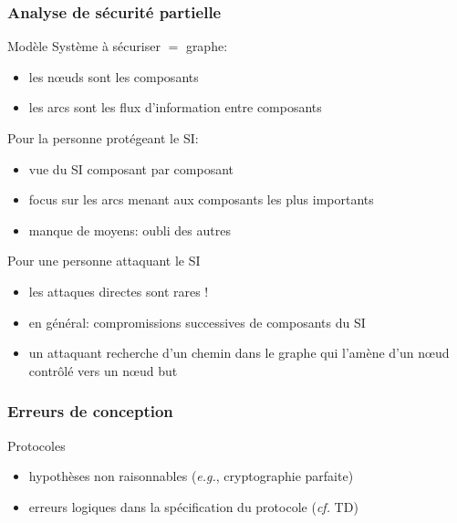 \begin{reveals}
\begin{frame}
  \vfill

\end{frame}




\begin{frame}
  \frametitle{Analyse de sécurité partielle}

  \vfill

  \begin{block}{Modèle}
    Système à sécuriser \(=\) graphe:
    \begin{itemize}
    \item les n\oe uds sont les composants
    \item les arcs sont les flux d'information entre composants
    \end{itemize}
  \end{block}

  \vfill

  \begin{block}{Pour la personne protégeant le SI:}
    \begin{itemize}
    \item vue du SI composant par composant
    \item focus sur les arcs menant aux composants les plus importants
    \item manque de moyens: oubli des autres
    \end{itemize}
  \end{block}

  \vfill

  \begin{block}{Pour une personne attaquant le SI}
    \begin{itemize}
    \item les attaques directes sont rares !
    \item en général: compromissions successives de
    composants du SI
    \item un attaquant recherche d'un chemin dans le graphe qui l'amène
    d'un n\oe ud contrôlé vers un n\oe ud but
    \end{itemize}
  \end{block}


\end{frame}


\begin{frame}
  \frametitle{Erreurs de conception}

  \vfill
  \begin{block}{Protocoles}
    \begin{itemize}
    \item hypothèses non raisonnables (\textit{e.g.}, cryptographie parfaite)
    \item erreurs logiques dans la spécification du protocole (\textit{cf.} TD)
    \end{itemize}
  \end{block}


\end{frame}
\end{reveals}
